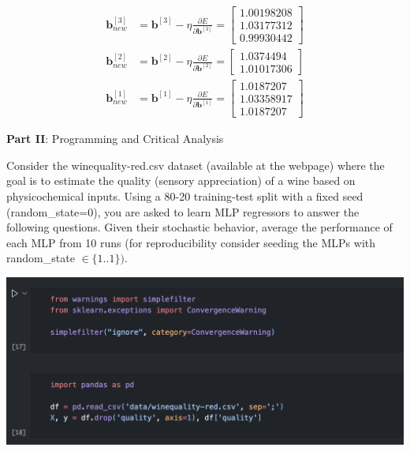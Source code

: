 \documentclass[12pt]{article}
\begin{document}
\begin{enumerate}[leftmargin=\labelsep]
    \begin{equation}
    \begin{aligned}
        \mathbf{b}_{new}^{[3]} &= \mathbf{b}^{[3]} - \eta \frac{\partial E}{\partial \mathbf{b}^{[3]}}
        = \begin{bmatrix}
            1.00198208 \\ 1.03177312 \\ 0.99930442
            \end{bmatrix} \\
        \mathbf{b}_{new}^{[2]} &= \mathbf{b}^{[2]} - \eta \frac{\partial E}{\partial \mathbf{b}^{[2]}}
        = \begin{bmatrix}
            1.0374494 \\ 1.01017306
        \end{bmatrix} \\
        \mathbf{b}_{new}^{[1]} &= \mathbf{b}^{[1]} - \eta \frac{\partial E}{\partial \mathbf{b}^{[1]}}
        = \begin{bmatrix}
            1.0187207 \\ 1.03358917 \\ 1.0187207 
            \end{bmatrix}
    \end{aligned}
    \end{equation}

\end{enumerate}

\vskip 1cm

\large{\textbf{Part II}: Programming and Critical Analysis}\normalsize

Consider the winequality-red.csv dataset (available at the webpage) where the goal is to estimate
the quality (sensory appreciation) of a wine based on physicochemical inputs.
Using a 80-20 training-test split with a fixed seed (random\_state=0), you are asked to learn MLP
regressors to answer the following questions.
Given their stochastic behavior, average the performance of each MLP from 10 runs
(for reproducibility consider seeding the MLPs with random\_state $\in \{1. .1\})$.

\begin{center}
    \includegraphics[scale=0.6]{images/code6.png}
\end{center}
\end{document}
